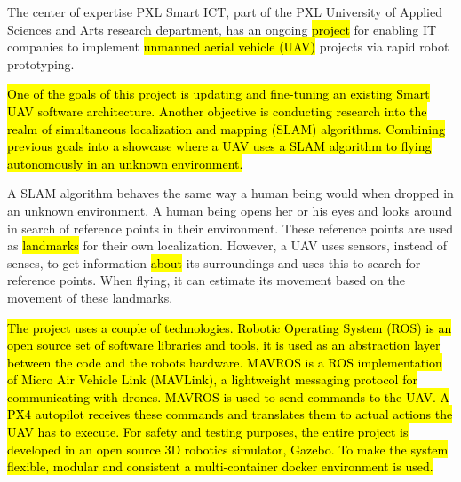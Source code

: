 The center of expertise PXL Smart ICT, part of the PXL University of Applied Sciences and Arts research department, has an ongoing \hl{project} for enabling IT companies to implement \hl{unmanned aerial vehicle (UAV)} projects via rapid robot prototyping.

\hl{One of the goals of this project is updating and fine-tuning an existing Smart UAV software architecture. Another objective is conducting research into the realm of simultaneous localization and mapping (SLAM) algorithms. Combining previous goals into a showcase where a UAV uses a SLAM algorithm to flying autonomously in an unknown environment.}

A SLAM algorithm behaves the same way a human being would when dropped in an unknown environment. A human being opens her or his eyes and looks around in search of reference points in their environment. These reference points are used as \hl{landmarks} for their own localization. However, a UAV uses sensors, instead of senses, to get information \hl{about} its surroundings and uses this to search for reference points. When flying, it can estimate its movement based on the movement of these landmarks.

\hl{The project uses a couple of technologies. Robotic Operating System (ROS) is an open source set of software libraries and tools, it is used as an abstraction layer between the code and the robots hardware. MAVROS is a ROS implementation of Micro Air Vehicle Link (MAVLink), a lightweight messaging protocol for communicating with drones. MAVROS is used to send commands to the UAV. A PX4 autopilot receives these commands and translates them to actual actions the UAV has to execute. For safety and testing purposes, the entire project is developed in an open source 3D robotics simulator, Gazebo. To make the system flexible, modular and consistent a multi-container docker environment is used.}

